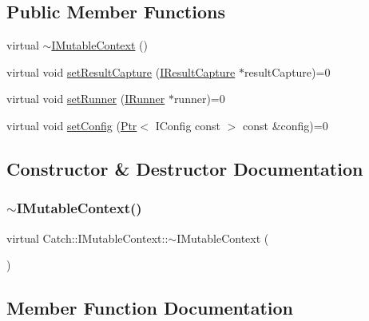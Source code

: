 \subsection*{Public Member Functions}
\begin{DoxyCompactItemize}
\item 
virtual \hyperlink{struct_catch_1_1_i_mutable_context_a93f32b2ab6d0fb83637059240be799ab}{$\sim$\+I\+Mutable\+Context} ()
\item 
virtual void \hyperlink{struct_catch_1_1_i_mutable_context_a4a80afd0525b7def21bee8d9b48f2d39}{set\+Result\+Capture} (\hyperlink{struct_catch_1_1_i_result_capture}{I\+Result\+Capture} $\ast$result\+Capture)=0
\item 
virtual void \hyperlink{struct_catch_1_1_i_mutable_context_af2e53b1dea4527a2587cff266a730f6e}{set\+Runner} (\hyperlink{struct_catch_1_1_i_runner}{I\+Runner} $\ast$runner)=0
\item 
virtual void \hyperlink{struct_catch_1_1_i_mutable_context_a013e8f688a8ea7970262d07ead542a63}{set\+Config} (\hyperlink{class_catch_1_1_ptr}{Ptr}$<$ I\+Config const $>$ const \&config)=0
\end{DoxyCompactItemize}


\subsection{Constructor \& Destructor Documentation}
\hypertarget{struct_catch_1_1_i_mutable_context_a93f32b2ab6d0fb83637059240be799ab}{}\label{struct_catch_1_1_i_mutable_context_a93f32b2ab6d0fb83637059240be799ab} 
\subsubsection{\texorpdfstring{$\sim$\+I\+Mutable\+Context()}{~IMutableContext()}}
{\footnotesize\ttfamily virtual Catch\+::\+I\+Mutable\+Context\+::$\sim$\+I\+Mutable\+Context (\begin{DoxyParamCaption}{ }\end{DoxyParamCaption})\hspace{0.3cm}{\ttfamily [virtual]}}



\subsection{Member Function Documentation}
\hypertarget{struct_catch_1_1_i_mutable_context_a013e8f688a8ea7970262d07ead542a63}{}\label{struct_catch_1_1_i_mutable_context_a013e8f688a8ea7970262d07ead542a63} 

